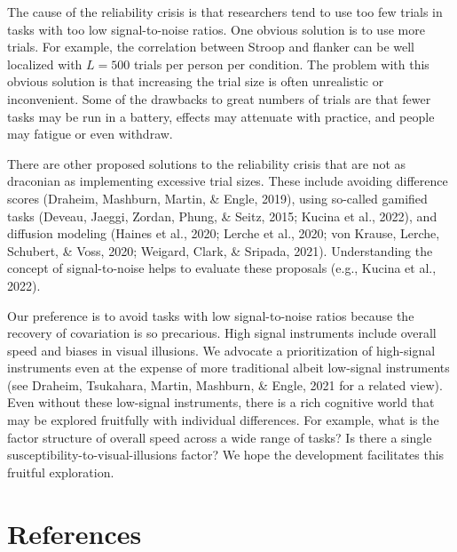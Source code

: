\documentclass[
  ,man]{apa6}
\begin{document}
The cause of the reliability crisis is that researchers tend to use too few trials in tasks with too low signal-to-noise ratios. One obvious solution is to use more trials. For example, the correlation between Stroop and flanker can be well localized with \(L=500\) trials per person per condition. The problem with this obvious solution is that increasing the trial size is often unrealistic or inconvenient. Some of the drawbacks to great numbers of trials are that fewer tasks may be run in a battery, effects may attenuate with practice, and people may fatigue or even withdraw.

There are other proposed solutions to the reliability crisis that are not as draconian as implementing excessive trial sizes. These include avoiding difference scores (Draheim, Mashburn, Martin, \& Engle, 2019), using so-called gamified tasks (Deveau, Jaeggi, Zordan, Phung, \& Seitz, 2015; Kucina et al., 2022), and diffusion modeling (Haines et al., 2020; Lerche et al., 2020; von Krause, Lerche, Schubert, \& Voss, 2020; Weigard, Clark, \& Sripada, 2021). Understanding the concept of signal-to-noise helps to evaluate these proposals (e.g., Kucina et al., 2022).

Our preference is to avoid tasks with low signal-to-noise ratios because the recovery of covariation is so precarious. High signal instruments include overall speed and biases in visual illusions. We advocate a prioritization of high-signal instruments even at the expense of more traditional albeit low-signal instruments (see Draheim, Tsukahara, Martin, Mashburn, \& Engle, 2021 for a related view). Even without these low-signal instruments, there is a rich cognitive world that may be explored fruitfully with individual differences. For example, what is the factor structure of overall speed across a wide range of tasks? Is there a single susceptibility-to-visual-illusions factor? We hope the development facilitates this fruitful exploration.

\newpage

\hypertarget{references}{%
\section*{References}\label{references}}
\end{document}
